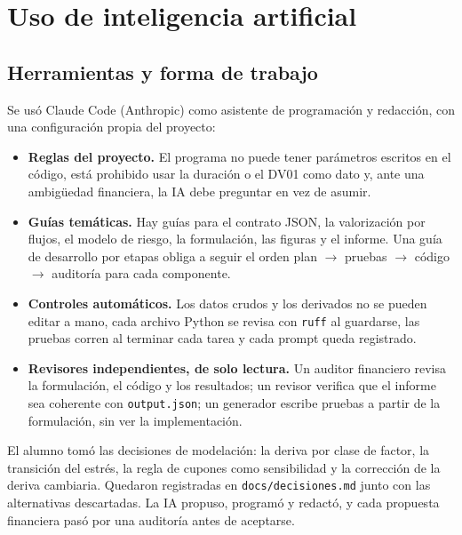 \section{Uso de inteligencia artificial}\label{app:ia}

\subsection{Herramientas y forma de trabajo}
Se usó Claude Code (Anthropic) como asistente de programación y redacción, con una configuración propia del
proyecto:
\begin{itemize}
  \item \textbf{Reglas del proyecto.} El programa no puede tener parámetros escritos en el código, está
    prohibido usar la duración o el DV01 como dato y, ante una ambigüedad financiera, la IA debe preguntar en
    vez de asumir.
  \item \textbf{Guías temáticas.} Hay guías para el contrato JSON, la valorización por flujos, el modelo de
    riesgo, la formulación, las figuras y el informe. Una guía de desarrollo por etapas obliga a seguir el
    orden plan $\to$ pruebas $\to$ código $\to$ auditoría para cada componente.
  \item \textbf{Controles automáticos.} Los datos crudos y los derivados no se pueden editar a mano, cada
    archivo Python se revisa con \texttt{ruff} al guardarse, las pruebas corren al terminar cada tarea y cada
    prompt queda registrado.
  \item \textbf{Revisores independientes, de solo lectura.} Un auditor financiero revisa la formulación, el
    código y los resultados; un revisor verifica que el informe sea coherente con \texttt{output.json}; un
    generador escribe pruebas a partir de la formulación, sin ver la implementación.
\end{itemize}

El alumno tomó las decisiones de modelación: la deriva por clase de factor, la transición del estrés, la
regla de cupones como sensibilidad y la corrección de la deriva cambiaria. Quedaron registradas en
\texttt{docs/decisiones.md} junto con las alternativas descartadas. La IA propuso, programó y redactó, y
cada propuesta financiera pasó por una auditoría antes de aceptarse.

